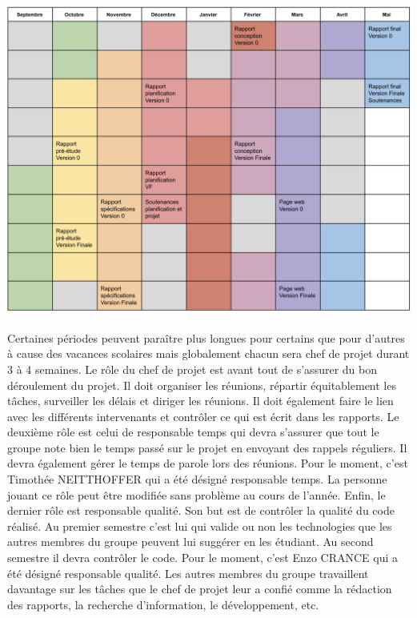 \paragraph{}
\begin{mdframed}[frametitle={Figure 14 : Planning des rotations du rôle de chef de projet}, innerbottommargin=10]
\begin{center}
\includegraphics[width=\linewidth]{planning.png}
\end{center}
\end{mdframed}
    
\paragraph{}
Certaines périodes peuvent paraître plus longues pour certains que pour d’autres à cause des vacances
scolaires mais globalement chacun sera chef de projet durant 3 à 4 semaines. Le rôle du chef de projet est
avant tout de s’assurer du bon déroulement du projet. Il doit organiser les réunions, répartir équitablement
les tâches, surveiller les délais et diriger les réunions. Il doit également faire le lien avec les
différents intervenants et contrôler ce qui est écrit dans les rapports. Le deuxième rôle est celui de
responsable temps qui devra s’assurer que tout le groupe note bien le temps passé sur le projet en envoyant
des rappels réguliers. Il devra également gérer le temps de parole lors des réunions. Pour le moment,
c’est Timothée NEITTHOFFER qui a été désigné responsable temps. La personne jouant ce rôle peut être
modifiée sans problème au cours de l’année. Enfin, le dernier rôle est responsable qualité. Son but est de
contrôler la qualité du code réalisé. Au premier semestre c’est lui qui valide ou non les technologies que les
autres membres du groupe peuvent lui suggérer en les étudiant. Au second semestre il devra contrôler le code.
Pour le moment, c’est Enzo CRANCE qui a été désigné responsable qualité. Les autres membres du groupe travaillent
davantage sur les tâches que le chef de projet leur a confié comme la rédaction des rapports, la
recherche d’information, le développement, etc.

